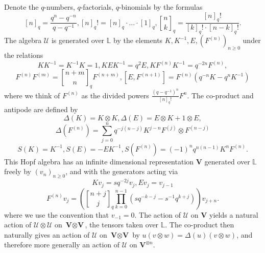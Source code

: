 \documentclass[letterpaper]{amsart}
\begin{document}
Denote the $q$-numbers, $q$-factorials, $q$-binomials by the formulas
$$[n]_q = \frac{q^n - q^{-n}}{q - q^{-1}}, [n]_q! = [n]_q\cdot\ldots\cdot[1]_q, {n \brack k}_q = \frac{[n]_q!}{[k]_q!\cdot[n-k]_q!}.$$
The algebra $\mathcal{U}$ is generated over $\mathbb{L}$ by the elements $K,K^{-1},E,(F^{(n)})_{n\geq0}$ under the relations
$$KK^{-1} = K^{-1}K = 1, KEK^{-1} = q^2E, KF^{(n)}K^{-1} = q^{-2n}F^{(n)},$$
$$F^{(n)}F^{(m)} = {n + m \brack n}_q F^{(n + m)}, [E, F^{(n + 1)}] = F^{(n)}(q^{-n}K-q^nK^{-1})$$
where we think of $F^{(n)}$ as the divided powers $\frac{(q-q^{-1})^n}{[n]_q!}F^n$. The co-product and antipode are defined by
$$\Delta(K) = K \otimes K, \Delta(E) = E \otimes K + 1 \otimes E,$$ $$\Delta(F^{(n)}) = \sum_{j=0}^n q^{-j(n-j)}K^{j-n}F^{(j)}\otimes F^{(n-j)}$$
$$S(K) = K^{-1}, S(E) = -EK^{-1}, S(F^{(n)}) = (-1)^n q^{n(n-1)}K^nF^{(n)}.$$
This Hopf algebra has an infinite dimensional representation $\textbf{V}$ generated over $\mathbb{L}$ freely by $(v_n)_{n\geq0}$, and with the generators acting via
$$Kv_j = sq^{-2j}v_j, Ev_j = v_{j - 1}$$
$$F^{(n)}v_j = \left({n + j \brack j}_q\prod_{k=0}^{n-1} (sq^{-k-j} - s^{-1}q^{k+j})\right) v_{j + n}.$$
where we use the convention that $v_{-1} = 0$.
The action of $\mathcal{U}$ on $\textbf{V}$ yields a natural action of $\mathcal{U}\otimes\mathcal{U}$ on $\textbf{V}\otimes\textbf{V}$, the tensors taken over $\mathbb{L}$. The co-product then naturally gives an action of $\mathcal{U}$ on $\textbf{V} \otimes \textbf{V}$ by $u(v\otimes w) = \Delta(u)(v \otimes w)$, and therefore more generally an action of $\mathcal{U}$ on $\textbf{V}^{\otimes n}$.
\end{document}

